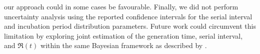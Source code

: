 our approach could in some cases be favourable.
Finally, we did not perform uncertainty analysis using
the reported confidence intervals for
the serial interval and incubation period distribution parameters.
Future work could circumvent this limitation by exploring
joint estimation of the generation time, serial interval, and $\Re(t)$
within the same Bayesian framework as described by \cite{Cori2013}.
